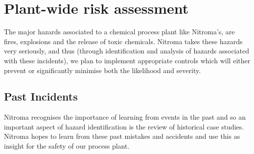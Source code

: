 \section{Plant-wide risk assessment}

The major hazards associated to a chemical process plant like Nitroma’s, are fires, explosions and the release of toxic chemicals. Nitroma takes these hazards very seriously, and thus (through identification and analysis of hazards associated with these incidents), we plan to implement appropriate controls which will either prevent or significantly minimise both the likelihood and severity. 

\subsection{Past Incidents}

Nitroma recognises the importance of learning from events in the past and so an important aspect of hazard identification is the review of historical case studies. Nitroma hopes to learn from these past mistakes and accidents and use this as insight for the safety of our process plant.


